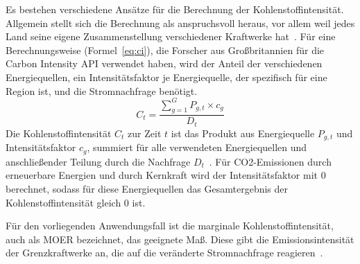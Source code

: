 Es bestehen verschiedene Ansätze für die Berechnung der Kohlenstoffintensität.
Allgemein stellt sich die Berechnung als anspruchsvoll heraus, vor allem weil jedes Land seine eigene Zusammenstellung verschiedener Kraftwerke hat~\cite{Currie.2024}.
Für eine Berechnungsweise (Formel~\ref{eq:ci}), die Forscher aus Großbritannien für die Carbon Intensity \ac{API} verwendet haben, wird der Anteil der verschiedenen Energiequellen, ein Intensitätsfaktor je Energiequelle, der spezifisch für eine Region ist, und die Stromnachfrage benötigt.
\begin{equation}
 \label{eq:ci}
 C_t = \frac{\sum_{g=1}^{G} P_{g,t} \times c_g}{D_t}
\end{equation}
Die Kohlenstoffintensität $C_t$ zur Zeit $t$ ist das Produkt aus Energiequelle $P_{g,t}$ und Intensitätsfaktor $c_g$, summiert für alle verwendeten Energiequellen und anschließender Teilung durch die Nachfrage $D_t$~\cite{LyndonRuff.20220420T15:34:17.000Z}.
Für \ac{CO2}-Emissionen durch erneuerbare Energien und durch Kernkraft wird der Intensitätsfaktor mit 0 berechnet, sodass für diese Energiequellen das Gesamtergebnis der Kohlenstoffintensität gleich 0 ist.

Für den vorliegenden Anwendungsfall ist die marginale Kohlenstoffintensität, auch als \ac{MOER} bezeichnet, das geeignete Maß.
Diese gibt die Emissionsintensität der Grenzkraftwerke an, die auf die veränderte Stromnachfrage reagieren~\cite{Buchanan.2023}.

